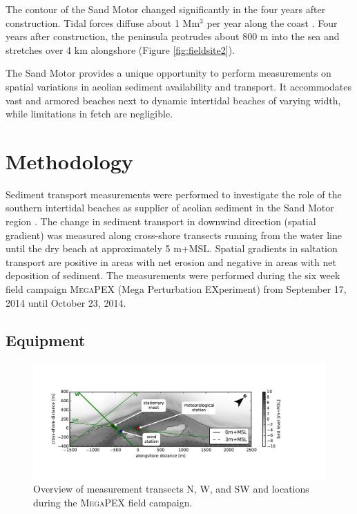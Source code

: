 The contour of the Sand Motor changed significantly in the four years
after construction. Tidal forces diffuse about 1 $\mathrm{Mm^3}$ per
year along the coast \citep{deSchipper2016}. Four years after
construction, the peninsula protrudes about 800 m into the sea and
stretches over 4 km alongshore (Figure \ref{fig:fieldsite2}).


The Sand Motor provides a unique opportunity to perform measurements
on spatial variations in aeolian sediment availability and transport.
It accommodates vast and armored beaches next to dynamic intertidal
beaches of varying width, while limitations in fetch are negligible.

\section{Methodology}

Sediment transport measurements were performed to investigate the role
of the southern intertidal beaches as supplier of aeolian sediment in
the Sand Motor region \citep{Hoonhout2017a}. The change in sediment
transport in downwind direction (spatial gradient) was measured along
cross-shore transects running from the water line until the dry beach
at approximately 5 m+MSL. Spatial gradients in saltation transport are
positive in areas with net erosion and negative in areas with net
deposition of sediment.  The measurements were performed
during the six week field campaign \textsc{MegaPEX} (Mega Perturbation
EXperiment) from September 17, 2014 until October 23, 2014.

\subsection{Equipment}

\begin{figure}
 \centering
  \includegraphics[width=\columnwidth]{../Figures/overview}
  \caption{Overview of measurement transects N, W, and SW and
    locations during the \textsc{MegaPEX} field campaign.}
  \label{fig:overview}
\end{figure}

